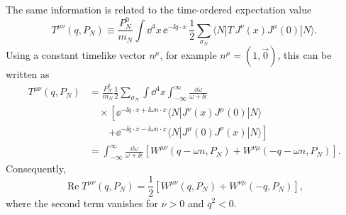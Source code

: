 The same information is related to the time-ordered expectation value
\[
  T^{\mu\nu}(q,P_N)
  \equiv
  \frac{P_N^0}{m_N}
  \int\dd^4x\,\ee^{-\ii q\cdot x}\,
  \frac12\sum_{\sigma_N}
  \langle N|T\,J^\nu(x)J^\mu(0)|N\rangle .
\]
Using a constant timelike vector \(n^\mu\), for example
\(n^\mu=(1,\vec 0)\), this can be written as
\[
\begin{aligned}
  T^{\mu\nu}(q,P_N)
  &=
  \frac{P_N^0}{m_N}
  \frac12\sum_{\sigma_N}
  \int\dd^4x\int_{-\infty}^{\infty}
  \frac{\dd\omega}{\omega+\ii\epsilon}
\\
  &\quad\times
  \left[
    \ee^{-\ii q\cdot x+\ii\omega n\cdot x}
    \langle N|J^\nu(x)J^\mu(0)|N\rangle
  \right.
\\
  &\qquad\left.
    +
    \ee^{-\ii q\cdot x-\ii\omega n\cdot x}
    \langle N|J^\mu(0)J^\nu(x)|N\rangle
  \right]
\\
  &=
  \int_{-\infty}^{\infty}
  \frac{\dd\omega}{\omega+\ii\epsilon}
  \left[
    W^{\mu\nu}(q-\omega n,P_N)
    +W^{\nu\mu}(-q-\omega n,P_N)
  \right].
\end{aligned}
\]
Consequently,
\[
  \operatorname{Re}T^{\mu\nu}(q,P_N)
  =
  \frac12
  \left[
    W^{\mu\nu}(q,P_N)
    +W^{\nu\mu}(-q,P_N)
  \right],
\]
where the second term vanishes for \(\nu>0\) and \(q^2<0\).

